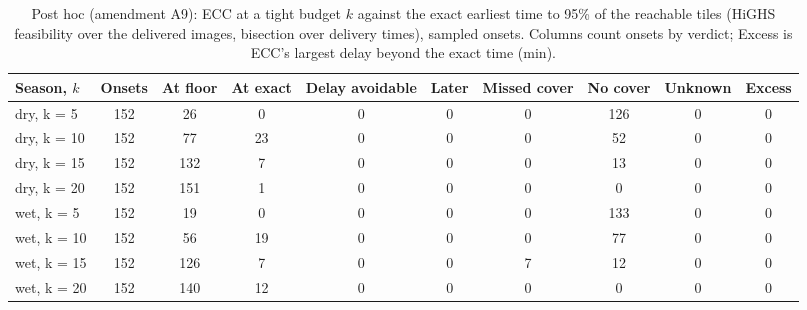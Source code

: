 \begin{table}[H]
\centering
\footnotesize
\renewcommand{\arraystretch}{1.2}
\setlength{\tabcolsep}{3.5pt}
\caption{Post hoc (amendment A9): ECC at a tight budget $k$ against the exact earliest time to 95\% of the reachable tiles (HiGHS feasibility over the delivered images, bisection over delivery times), sampled onsets. Columns count onsets by verdict; Excess is ECC's largest delay beyond the exact time (min).}
\label{tab:a9_budget}
\begin{tabular}{|l|c|c|c|c|c|c|c|c|c|}
\hline
Season, $k$ & Onsets & At floor & At exact & Delay avoidable & Later & Missed cover & No cover & Unknown & Excess \\
\hline
dry, k = 5 & 152 & 26 & 0 & 0 & 0 & 0 & 126 & 0 & 0 \\
\hline
dry, k = 10 & 152 & 77 & 23 & 0 & 0 & 0 & 52 & 0 & 0 \\
\hline
dry, k = 15 & 152 & 132 & 7 & 0 & 0 & 0 & 13 & 0 & 0 \\
\hline
dry, k = 20 & 152 & 151 & 1 & 0 & 0 & 0 & 0 & 0 & 0 \\
\hline
wet, k = 5 & 152 & 19 & 0 & 0 & 0 & 0 & 133 & 0 & 0 \\
\hline
wet, k = 10 & 152 & 56 & 19 & 0 & 0 & 0 & 77 & 0 & 0 \\
\hline
wet, k = 15 & 152 & 126 & 7 & 0 & 0 & 7 & 12 & 0 & 0 \\
\hline
wet, k = 20 & 152 & 140 & 12 & 0 & 0 & 0 & 0 & 0 & 0 \\
\hline
\end{tabular}
\end{table}
